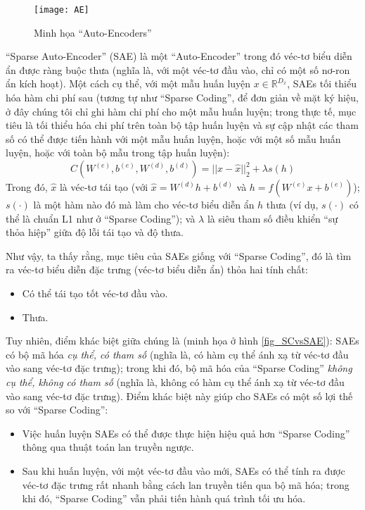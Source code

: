 \begin{figure}
	\centering
	\texttt{[image: AE]}
	\caption{Minh họa ``Auto-Encoders''}
	\label{fig_AE}
\end{figure}
``Sparse Auto-Encoder'' (SAE) là một ``Auto-Encoder'' trong đó véc-tơ biểu diễn ẩn được ràng buộc thưa (nghĩa là, với một véc-tơ đầu vào, chỉ có một số nơ-ron ẩn kích hoạt). Một cách cụ thể, với một mẫu huấn luyện $x \in \mathbb{R}^{D_x}$, SAEs tối thiểu hóa hàm chi phí sau (tương tự như ``Sparse Coding'', để đơn giản về mặt ký hiệu, ở đây chúng tôi chỉ ghi hàm chi phí cho một mẫu huấn luyện; trong thực tế, mục tiêu là tối thiểu hóa chi phí trên toàn bộ tập huấn luyện và sự cập nhật các tham số có thể được tiến hành với một mẫu huấn luyện, hoặc với một số mẫu huấn luyện, hoặc với toàn bộ mẫu trong tập huấn luyện):
\begin{equation}
	C(W^{(e)}, b^{(e)}, W^{(d)}, b^{(d)}) = ||x - \hat{x}||_2^2 + \lambda s(h)
	\label{eq_SAE}
\end{equation}
Trong đó, $\hat{x}$ là véc-tơ tái tạo (với $\hat{x} = W^{(d)}h + b^{(d)}$ và $h = f(W^{(e)}x + b^{(e)})$); $s(\cdot)$ là một hàm nào đó mà làm cho véc-tơ biểu diễn ẩn $h$ thưa (ví dụ, $s(\cdot)$ có thể là chuẩn L1 như ở ``Sparse Coding''); và $\lambda$ là siêu tham số điều khiển ``sự thỏa hiệp'' giữa độ lỗi tái tạo và độ thưa.

Như vậy, ta thấy rằng, mục tiêu của SAEs giống với ``Sparse Coding'', đó là tìm ra véc-tơ biểu diễn đặc trưng (véc-tơ biểu diễn ẩn) thỏa hai tính chất:
\begin{itemize}
	\item Có thể tái tạo tốt véc-tơ đầu vào.
	\item Thưa.
\end{itemize}

Tuy nhiên, điểm khác biệt giữa chúng là (minh họa ở hình \ref{fig_SCvsSAE}): SAEs có bộ mã hóa \emph{cụ thể, có tham số} (nghĩa là, có hàm cụ thể ánh xạ từ véc-tơ đầu vào sang véc-tơ đặc trưng); trong khi đó, bộ mã hóa của ``Sparse Coding'' \emph{không cụ thể, không có tham số} (nghĩa là, không có hàm cụ thể ánh xạ từ véc-tơ đầu vào sang véc-tơ đặc trưng). Điểm khác biệt này giúp cho SAEs có một số lợi thế so với ``Sparse Coding'':
\begin{itemize}
	\item Việc huấn luyện SAEs có thể được thực hiện hiệu quả hơn ``Sparse Coding'' thông qua thuật toán lan truyền ngược.
	\item Sau khi huấn luyện, với một véc-tơ đầu vào mới, SAEs có thể tính ra được véc-tơ đặc trưng rất nhanh bằng cách lan truyền tiến qua bộ mã hóa; trong khi đó, ``Sparse Coding'' vẫn phải tiến hành quá trình tối ưu hóa.
\end{itemize}

